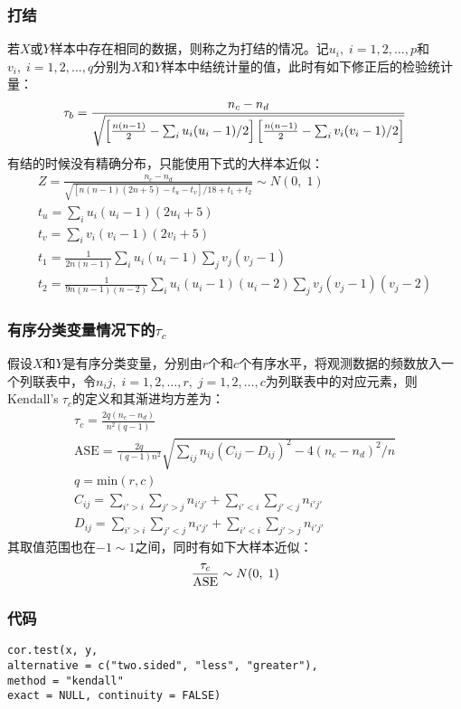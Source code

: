 \subsubsection{打结}
若$X$或$Y$样本中存在相同的数据，则称之为打结的情况。记$u_i,\;i=1,2,\dots,p$和$v_i,\;i=1,2,\dots,q$分别为$X$和$Y$样本中结统计量的值，此时有如下修正后的检验统计量：
\begin{equation}
	\tau_b=\frac{n_c-n_d}{\sqrt{\left[\frac{n(n-1)}{2}-\sum_iu_i(u_i-1)/2\right]\left[\frac{n(n-1)}{2}-\sum_iv_i(v_i-1)/2\right]}}\notag
\end{equation}
有结的时候没有精确分布，只能使用下式的大样本近似：
\begin{gather*}
Z=\frac{n_c-n_d}{\sqrt{\left[n(n-1)(2n+5)-t_u-t_v\right]/18+t_1+t_2}}\sim N(0,\;1) \\
t_u=\sum_iu_i(u_i-1)(2u_i+5) \\
t_v=\sum_iv_i(v_i-1)(2v_i+5) \\
t_1=\frac{1}{2n(n-1)}\sum_iu_i(u_i-1)\sum_jv_j(v_j-1) \\
t_2=\frac{1}{9n(n-1)(n-2)}\sum_iu_i(u_i-1)(u_i-2)\sum_jv_j(v_j-1)(v_j-2)
\end{gather*}
\subsubsection{有序分类变量情况下的$\tau_c$}
假设$X$和$Y$是有序分类变量，分别由$r$个和$c$个有序水平，将观测数据的频数放入一个列联表中，令$n_ij,\;i=1,2,\dots,r,\;j=1,2,\dots,c$为列联表中的对应元素，则Kendall's$\;\tau_c$的定义和其渐进均方差为：
\begin{gather*}
	\tau_c=\frac{2q(n_c-n_d)}{n^2(q-1)} \\
	\text{ASE}=\frac{2q}{(q-1)n^2}\sqrt{\sum_{ij}n_{ij}(C_{ij}-D_{ij})^2-4(n_c-n_d)^2/n} \\
	q=\text{min}(r,c) \\
	C_{ij}=\sum_{i'>i}\sum_{j'>j}n_{i'j'}+\sum_{i'<i}\sum_{j'<j}n_{i'j'} \\
	D_{ij}=\sum_{i'>i}\sum_{j'<j}n_{i'j'}+\sum_{i'<i}\sum_{j'>j}n_{i'j'}
\end{gather*}
其取值范围也在$-1\sim 1$之间，同时有如下大样本近似：
\begin{equation}
	\frac{\tau_c}{\text{ASE}}\sim N(0,\;1)\notag
\end{equation}
\subsubsection{代码}
\begin{verbatim}
cor.test(x, y,
alternative = c("two.sided", "less", "greater"),
method = "kendall"
exact = NULL, continuity = FALSE) 
\end{verbatim}